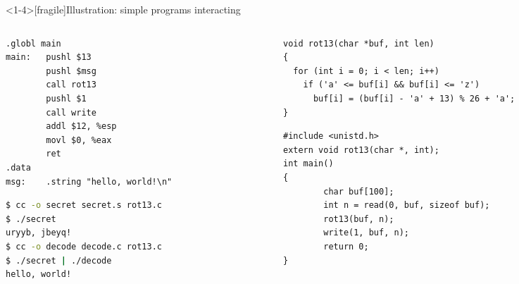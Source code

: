 \documentclass[aspectratio=1610,mathserif]{beamer}
\begin{document}
\begin{frame}<1-4>[fragile]{Illustration: simple programs interacting}
  \begin{columns}
  \begin{column}{.41\textwidth}
  \begin{lstlisting}[title={secret.s}]
.globl main
main:   pushl $13
        pushl $msg
        call rot13
        pushl $1
        call write
        addl $12, %esp
        movl $0, %eax
        ret
.data
msg:    .string "hello, world!\n"
  \end{lstlisting}
  \vspace{1em}
  \begin{lstlisting}[language=sh]
$ cc -o secret secret.s rot13.c
$ ./secret
uryyb, jbeyq!
$ cc -o decode decode.c rot13.c
$ ./secret | ./decode
hello, world!
  \end{lstlisting}
  \end{column}
  \begin{column}{.595\textwidth}
  \begin{lstlisting}[title={rot13.c}]
void rot13(char *buf, int len)
{
  for (int i = 0; i < len; i++)
    if ('a' <= buf[i] && buf[i] <= 'z')
      buf[i] = (buf[i] - 'a' + 13) % 26 + 'a';
}
  \end{lstlisting}
  \begin{lstlisting}[title={decode.c}]
#include <unistd.h>
extern void rot13(char *, int);
int main()
{
        char buf[100];
        int n = read(0, buf, sizeof buf);
        rot13(buf, n);
        write(1, buf, n);
        return 0;
}
  \end{lstlisting}
  \end{column}
  \end{columns}
\end{frame}
\end{document}
